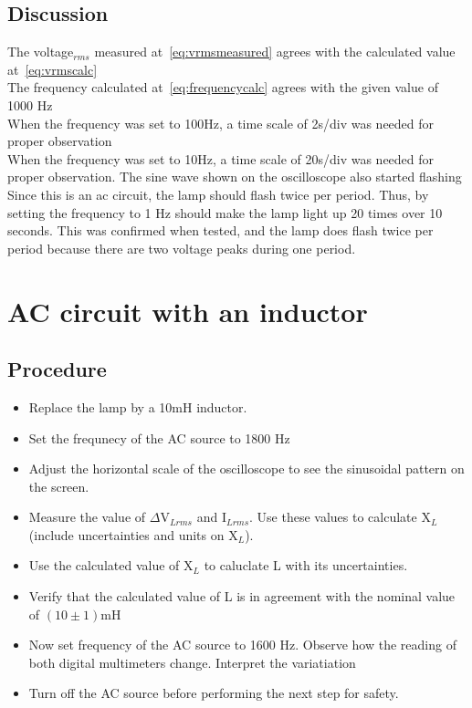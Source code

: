 \documentclass{report}
\begin{document}
\section{Discussion}
The voltage$_{rms}$ measured at~\eqref{eq:vrmsmeasured} agrees with the calculated value at~\eqref{eq:vrmscalc}\\
The frequency calculated at~\eqref{eq:frequencycalc} agrees with the given value of 1000 \si{\hertz}\\
When the frequency was set to 100\si{\hertz}, a time scale of 2\si{\milli}\si{\second}/div was needed for proper observation\\
When the frequency was set to 10\si{\hertz}, a time scale of 20\si{\milli}\si{\second}/div was needed for proper observation. The sine wave shown on the oscilloscope also started flashing\\
Since this is an ac circuit, the lamp should flash twice per period. Thus, by setting the frequency to 1 \si{\hertz} should make the lamp light up 20 times over 10 seconds. This was confirmed when tested, and the lamp does flash twice per period because there are two voltage peaks during one period.

\chapter{AC circuit with an inductor}

\section{Procedure}
\begin{itemize}
    \item Replace the lamp by a 10\si{\milli\henry} inductor.
    \item Set the frequnecy of the AC source to 1800 \si{\hertz}
    \item Adjust the horizontal scale of the oscilloscope to see the sinusoidal pattern on the screen.
    \item Measure the value of $\Delta\si{\volt}_{Lrms}$ and I$_{Lrms}$. Use these values to calculate X$_{L}$ (include uncertainties and units on X$_{L}$).
    \item Use the calculated value of X$_{L}$ to caluclate L with its uncertainties.
    \item Verify that the calculated value of L is in agreement with the nominal value of $(10\pm1)\si{\milli\henry}$
    \item Now set frequency of the AC source to 1600 \si{\hertz}. Observe how the reading of both digital multimeters change. Interpret the variatiation 
    \item Turn off the AC source before performing the next step for safety.
\end{itemize}
    
\end{document}
